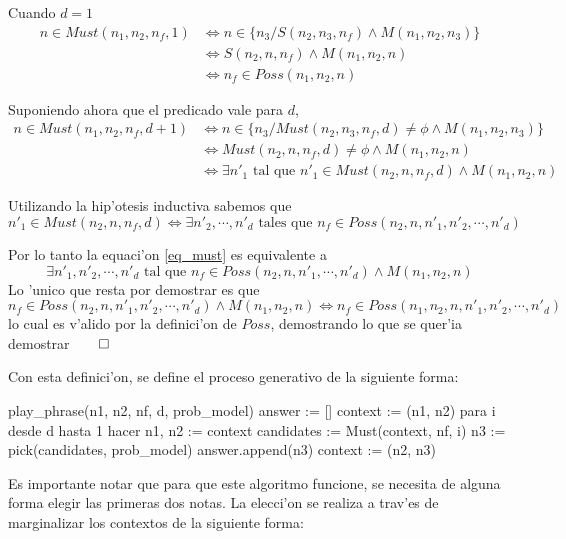 Cuando $d=1$
\begin{align*}
n \in Must(n_1, n_2, n_f, 1)   & \Leftrightarrow n \in \{n_3/ S(n_2, n_3, n_f) \land M(n_1, n_2, n_3)\} \\
                               & \Leftrightarrow S(n_2, n, n_f) \land M(n_1, n_2, n)   \\
                               & \Leftrightarrow n_f \in Poss(n_1, n_2, n)
\end{align*}

Suponiendo ahora que el predicado vale para $d$, 
\begin{align}
n \in Must(n_1, n_2, n_f, d+1)   & \Leftrightarrow n \in \{n_3/ Must(n_2, n_3, n_f, d) \neq \phi \land M(n_1,n_2, n_3)\} \nonumber \\
                                 & \Leftrightarrow Must(n_2, n, n_f, d) \neq \phi \land M(n_1,n_2, n) \nonumber \\
                                 & \Leftrightarrow \exists n'_1 \text{ tal que } n'_1 \in Must(n_2, n, n_f, d) \land M(n_1,n_2, n) \label{eq_must}
\end{align}

Utilizando la hip'otesis inductiva sabemos que 
$$  n'_1 \in Must(n_2, n, n_f, d) \Leftrightarrow \exists n'_2, \cdots, n'_{d} \text{ tales que } n_f \in Poss(n_2, n, n'_1, n'_2, \cdots, n'_{d})$$

Por lo tanto la equaci'on \ref{eq_must} es equivalente a
$$ \exists n'_1, n'_2, \cdots, n'_d \text{ tal que } n_f \in Poss(n_2, n, n'_1, \cdots, n'_d) \land M(n_1,n_2, n) $$
Lo 'unico que resta por demostrar es que 
$$ n_f \in Poss(n_2, n, n'_1, n'_2, \cdots, n'_d) \land M(n_1,n_2, n) \Leftrightarrow n_f \in Poss(n_1, n_2, n, n'_1, n'_2, \cdots, n'_d)$$
lo cual es v'alido por la definici'on de $Poss$, demostrando lo que se quer'ia demostrar$\qed$


Con esta definici'on, se define el proceso generativo de la siguiente forma:

\begin{algoritmo}
play_phrase(n1, n2, nf, d, prob_model)
    answer := []
    context := (n1, n2)
    para i desde d hasta 1 hacer
        n1, n2 := context
        candidates := Must(context, nf, i)
        n3 := pick(candidates, prob_model)
        answer.append(n3)
        context := (n2, n3) 
\end{algoritmo}

Es importante notar que para que este algoritmo funcione, se necesita de alguna forma elegir las primeras dos notas. La elecci'on se realiza a trav'es de 
marginalizar los contextos de la siguiente forma:

